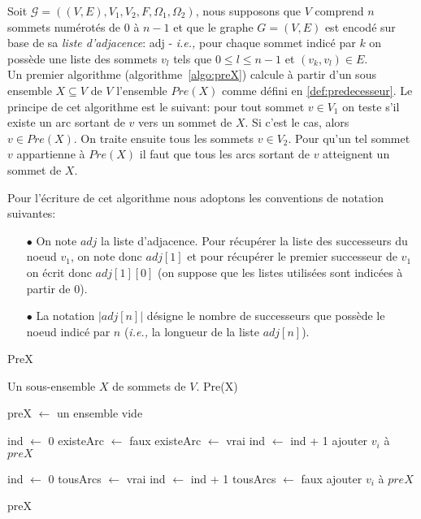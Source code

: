 Soit $\mathcal{G} = ((V,E),V_{1},V_{2}, F, \Omega _{1}, \Omega _{2})$, nous supposons que $V$ comprend $n$ sommets numérotés de $0$ à $n-1$ et que le graphe $G = (V,E)$ est encodé sur base de sa \textit{liste d'adjacence}: adj - \emph{i.e.,} pour chaque sommet indicé par $k$ on possède une liste des sommets $v_l$ tels que $0 \leq l \leq n-1$ et $(v_k, v_l) \in E$.\\

Un premier algorithme (algorithme~\ref{algo:preX}) calcule à partir d'un sous ensemble $X \subseteq V$ de $V$ l'ensemble $Pre(X)$ comme défini en \ref{def:predecesseur}. Le principe de cet algorithme est le suivant: pour tout sommet $v\in V_{1}$ on teste s'il existe un arc sortant de $v$ vers un sommet de $X$. Si c'est le cas, alors $v\in Pre(X)$. On traite ensuite tous les sommets $v \in V_{2}$. Pour qu'un tel sommet $v$ appartienne à $Pre(X)$ il faut que tous les arcs sortant de $v$ atteignent un sommet de $X$.

\begin{notations}
	Pour l'écriture de cet algorithme nous adoptons les conventions de notation suivantes:
	\begin{itemize}
		\item[$\bullet$] On note $adj$ la liste d'adjacence. Pour récupérer la liste des successeurs du noeud $v_1$, on note donc $adj[1]$ et pour récupérer le premier successeur de $v_1$ on écrit donc $adj[1][0]$ (on suppose que les listes utilisées sont indicées à partir de 0).
		\item[$\bullet$] La notation $|adj[n]|$ désigne le nombre de successeurs que possède le noeud indicé par $n$ (\emph{i.e.,} la longueur de la liste $adj[n]$).
	\end{itemize}
\end{notations}

\begin{algorithm}
	\caption{PreX}
	\label{algo:preX}
	\begin{algorithmic}[1]
		\REQUIRE Un sous-ensemble $X$ de sommets de $V$.
		\ENSURE Pre(X)
		
		\STATE preX $\leftarrow$ un ensemble vide
		
			\STATE ind $\leftarrow$ 0
			\STATE existeArc $\leftarrow$ faux
					\STATE existeArc $\leftarrow$ vrai
				\ELSE
					\STATE ind $\leftarrow$ ind + 1
				\ENDIF
			\ENDWHILE
				\STATE ajouter $v_{i}$ à $preX$
			\ENDIF
		\ENDFOR
		
			\STATE ind $\leftarrow$ 0
			\STATE tousArcs $\leftarrow$ vrai
					\STATE ind $\leftarrow$ ind + 1
				\ELSE
					\STATE  tousArcs $\leftarrow$ faux
				\ENDIF
			\ENDWHILE
				\STATE ajouter $v_{i}$ à $preX$
			\ENDIF
		\ENDFOR
		
		\RETURN preX
			
\end{algorithmic}
		
\end{algorithm}

